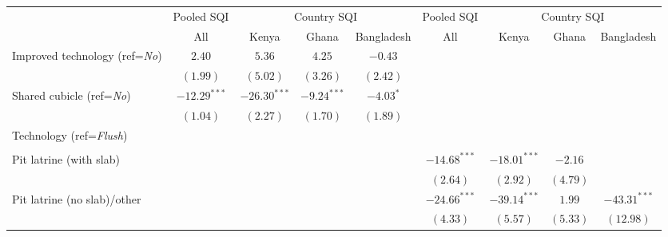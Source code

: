 
\begin{threeparttable}
\begin{tabular}{l@{} c@{} c@{} c@{} c@{} c@{} c@{} c@{} c@{}}
\toprule
 & \multicolumn{1}{c}{Pooled SQI} & \multicolumn{3}{c}{Country SQI} & \multicolumn{1}{c}{Pooled SQI} & \multicolumn{3}{c}{Country SQI} \\
\cmidrule(lr){2-2} \cmidrule(lr){3-5} \cmidrule(lr){6-6} \cmidrule(lr){7-9}
 & All & Kenya & Ghana & Bangladesh & All & Kenya & Ghana & Bangladesh \\
\midrule
Improved technology (ref=\textit{No})          & $2.40$         & $5.36$         & $4.25$        & $-0.43$       &                &                &                &                \\
                                               & $(1.99)$       & $(5.02)$       & $(3.26)$      & $(2.42)$      &                &                &                &                \\
Shared cubicle (ref=\textit{No})               & $-12.29^{***}$ & $-26.30^{***}$ & $-9.24^{***}$ & $-4.03^{*}$   &                &                &                &                \\
                                               & $(1.04)$       & $(2.27)$       & $(1.70)$      & $(1.89)$      &                &                &                &                \\
Technology (ref=\textit{Flush})                &                &                &               &               &                &                &                &                \\
                                               &                &                &               &               &                &                &                &                \\
\quad Pit latrine (with slab)                  &                &                &               &               & $-14.68^{***}$ & $-18.01^{***}$ & $-2.16$        &                \\
                                               &                &                &               &               & $(2.64)$       & $(2.92)$       & $(4.79)$       &                \\
\quad Pit latrine (no slab)/other              &                &                &               &               & $-24.66^{***}$ & $-39.14^{***}$ & $1.99$         & $-43.31^{***}$ \\
                                               &                &                &               &               & $(4.33)$       & $(5.57)$       & $(5.33)$       & $(12.98)$      \\

\end{tabular}
\end{threeparttable}
